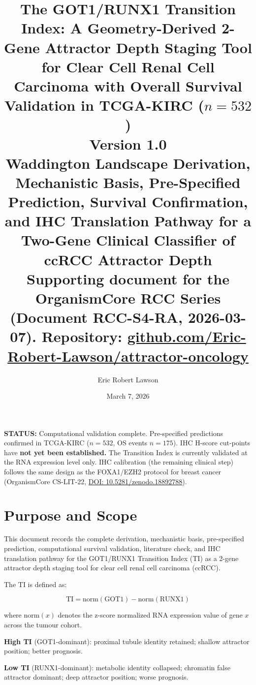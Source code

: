 \documentclass[11pt, a4paper]{article}
\title{
    \vspace{-1em}
    \textbf{The GOT1/RUNX1 Transition Index:
    A Geometry-Derived 2-Gene Attractor Depth
    Staging Tool for Clear Cell Renal Cell
    Carcinoma with Overall Survival Validation
    in TCGA-KIRC ($n{=}532$)}\\[0.5em]
    \large Version 1.0\\[0.4em]
    \normalsize Waddington Landscape Derivation,
    Mechanistic Basis, Pre-Specified Prediction,
    Survival Confirmation, and IHC Translation
    Pathway for a Two-Gene Clinical Classifier
    of ccRCC Attractor Depth\\[0.3em]
    \small Supporting document for the OrganismCore
    RCC Series (Document RCC-S4-RA, 2026-03-07).
    Repository:
    \href{https://github.com/Eric-Robert-Lawson/attractor-oncology}
    {github.com/Eric-Robert-Lawson/attractor-oncology}
}
\author[1]{Eric Robert Lawson}
\affil[1]{OrganismCore \textbar{}
    \href{mailto:OrganismCore@proton.me}
    {OrganismCore@proton.me} \textbar{}
    ORCID: 0009-0002-0414-6544}
\date{March 7, 2026}
\begin{document}
\maketitle
\thispagestyle{fancy}

\begin{mdframed}[backgroundcolor=warningbox,
                 linecolor=orange!70!black,
                 linewidth=1pt]
\textbf{STATUS:} Computational validation complete.
Pre-specified predictions confirmed in TCGA-KIRC
($n{=}532$, OS events $n{=}175$).
IHC H-score cut-points have \textbf{not yet been
established.} The Transition Index is currently
validated at the RNA expression level only.
IHC calibration (the remaining clinical step)
follows the same design as the FOXA1/EZH2 protocol
for breast cancer (OrganismCore CS-LIT-22,
\href{https://doi.org/10.5281/zenodo.18892788}
{DOI: 10.5281/zenodo.18892788}).
\end{mdframed}

\vspace{0.5em}
\tableofcontents
\newpage

\section{Purpose and Scope}

This document records the complete derivation,
mechanistic basis, pre-specified prediction,
computational survival validation, literature
check, and IHC translation pathway for the
GOT1/RUNX1 Transition Index (TI) as a 2-gene
attractor depth staging tool for clear cell
renal cell carcinoma (ccRCC).

The TI is defined as:

\begin{equation}
\text{TI} = \text{norm}(\text{GOT1})
           - \text{norm}(\text{RUNX1})
\label{eq:ti}
\end{equation}

\noindent where $\text{norm}(x)$ denotes the
z-score normalized RNA expression value of gene
$x$ across the tumour cohort.

\textbf{High TI} (GOT1-dominant):
proximal tubule identity retained;
shallow attractor position; better prognosis.

\textbf{Low TI} (RUNX1-dominant):
metabolic identity collapsed; chromatin false
attractor dominant; deep attractor position;
worse prognosis.
\end{document}
